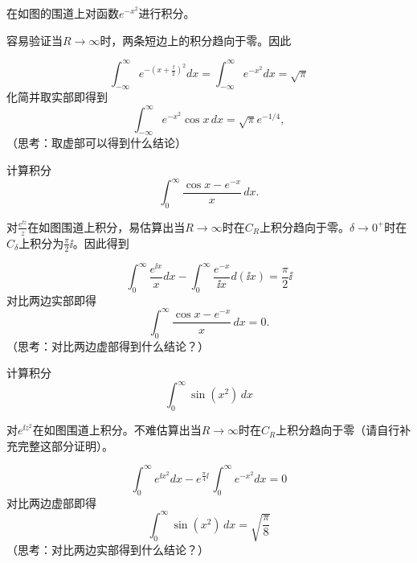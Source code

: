 \documentclass[CJK]{beamer}
\begin{document}
\begin{frame}
  \bch


  在如图的围道上对函数$e^{-x^2}$进行积分。

  容易验证当$R\rightarrow \infty$时，两条短边上的积分趋向于零。因此

  $$\int_{-\infty}^{\infty} e^{-(x+\frac{\ii}{2})^2}dx = \int_{-\infty}^{\infty} e^{-x^2}dx  =\sqrt{\pi}$$
  化简并取实部即得到
  $$\int_{-\infty}^{\infty}  e^{-x^2}\cos x\,dx = \sqrt{\pi}e^{-1/4},$$
  {\scriptsize （思考：取虚部可以得到什么结论）}

  \ech
\end{frame}



\begin{frame}
  \bch
  计算积分$$ \int_0^{\infty} \frac{\cos{x} - e^{-x}}{x}\, dx.$$
  \ech
\end{frame}


\begin{frame}
  \bch
  \emini
  对$\frac{e^{\ii z}}{z}$在如图围道上积分，易估算出当$R\rightarrow \infty$时在$C_R$上积分趋向于零。$\delta\rightarrow 0^+$时在$C_\delta$上积分为$\frac{\pi}{2}\ii$。因此得到
  \emini
  
  $$\int_0^\infty \frac{e^{\ii x}}{x} dx - \int_0^\infty \frac{e^{- x}}{\ii x} d(\ii x)  = \frac{\pi}{2}\ii$$
  对比两边实部即得
  $$ \int_0^{\infty} \frac{\cos{x} - e^{-x}}{x}\, dx = 0.$$
  {\scriptsize （思考：对比两边虚部得到什么结论？）}
  \ech
\end{frame}



\begin{frame}
  \bch
  
  计算积分 $$ \int_0^{\infty} \sin(x^2)\, dx $$
  \ech
\end{frame}




\begin{frame}
  \bch
  \emini
  对$e^{\ii z^2}$在如图围道上积分。不难估算出当$R\rightarrow \infty$时在$C_R$上积分趋向于零（请自行补充完整这部分证明）。
  \emini
  
  $$\int_0^\infty e^{\ii x^2} dx - e^{\frac{\pi}{4}\ii}\, \int_0^\infty e^{- x^2}dx  = 0 $$
  对比两边虚部即得
  $$ \int_0^{\infty} \sin(x^2)\,dx = \sqrt{\frac{\pi}{8}} $$ 
  {\scriptsize （思考：对比两边实部得到什么结论？）}
  \ech
\end{frame}
\end{document}
